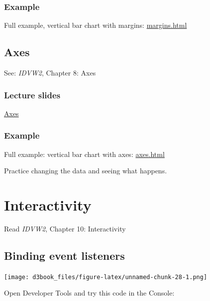 \documentclass[openany]{book}
\begin{document}
\hypertarget{example}{%
\subsection{Example}\label{example}}

Full example, vertical bar chart with margins: \href{code/margins.html}{margins.html}

\hypertarget{axes}{%
\section{Axes}\label{axes}}

See: \emph{IDVW2}, Chapter 8: Axes

\hypertarget{lecture-slides-3}{%
\subsection{Lecture slides }\label{lecture-slides-3}}

\href{pdfs/axes.pdf}{Axes}

\hypertarget{example-1}{%
\subsection{Example}\label{example-1}}

Full example: vertical bar chart with axes: \href{code/axes.html}{axes.html}

Practice changing the data and seeing what happens.

\hypertarget{interactivity}{%
\chapter{Interactivity }\label{interactivity}}

Read \emph{IDVW2}, Chapter 10: Interactivity

\hypertarget{binding-event-listeners}{%
\section{Binding event listeners}\label{binding-event-listeners}}

\texttt{[image: d3book\_files/figure-latex/unnamed-chunk-28-1.png]}

Open Developer Tools and try this code in the Console:
\end{document}
